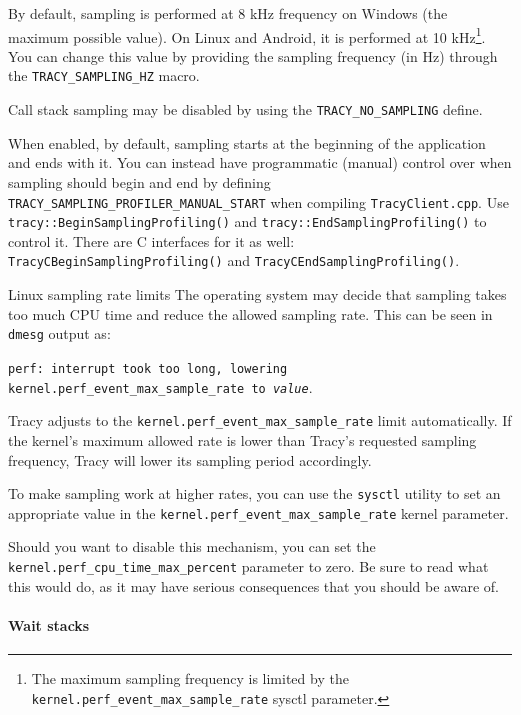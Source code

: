 \documentclass[hidelinks,titlepage,a4paper,twoside]{article}
\begin{document}
By default, sampling is performed at 8 kHz frequency on Windows (the maximum possible value). On Linux and Android, it is performed at 10 kHz\footnote{The maximum sampling frequency is limited by the \texttt{kernel.perf\_event\_max\_sample\_rate} sysctl parameter.}. You can change this value by providing the sampling frequency (in Hz) through the \texttt{TRACY\_SAMPLING\_HZ} macro.

Call stack sampling may be disabled by using the \texttt{TRACY\_NO\_SAMPLING} define.

When enabled, by default, sampling starts at the beginning of the application and ends with it. You can instead have programmatic (manual) control over when sampling should begin and end by defining \texttt{TRACY\_SAMPLING\_PROFILER\_MANUAL\_START} when compiling \texttt{TracyClient.cpp}. Use \texttt{tracy::BeginSamplingProfiling()} and \texttt{tracy::EndSamplingProfiling()} to control it. There are C interfaces for it as well: \texttt{TracyCBeginSamplingProfiling()} and \texttt{TracyCEndSamplingProfiling()}.

\begin{bclogo}[
noborder=true,
couleur=black!5,
logo=\bcbombe
]{Linux sampling rate limits}
The operating system may decide that sampling takes too much CPU time and reduce the allowed sampling rate. This can be seen in \texttt{dmesg} output as:

\vspace{0.25em}

\texttt{perf: interrupt took too long, lowering kernel.perf\_event\_max\_sample\_rate to \emph{value}}.

\vspace{0.25em}

Tracy adjusts to the \texttt{kernel.perf\_event\_max\_sample\_rate} limit automatically. If the kernel's maximum allowed rate is lower than Tracy's requested sampling frequency, Tracy will lower its sampling period accordingly.

To make sampling work at higher rates, you can use the \texttt{sysctl} utility to set an appropriate value in the \texttt{kernel.perf\_event\_max\_sample\_rate} kernel parameter.

Should you want to disable this mechanism, you can set the \texttt{kernel.perf\_cpu\_time\_max\_percent} parameter to zero. Be sure to read what this would do, as it may have serious consequences that you should be aware of.
\end{bclogo}

\paragraph{Wait stacks}
\label{waitstacks}
\end{document}
